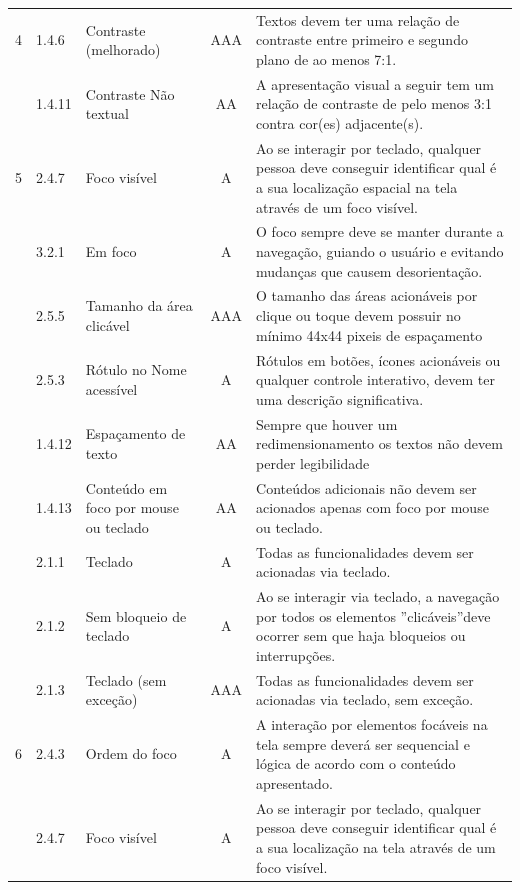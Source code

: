 {{\begin{minipage}{\linewidth}
{\begin{tabular}{|c|l|l|c|p{400px}|}
    \hline
    4 & 1.4.6 & 
        Contraste (melhorado) & AAA & Textos devem ter uma relação de contraste entre primeiro e segundo plano de ao menos 7:1.\\
        \cline{2-5} & 1.4.11 & Contraste Não textual & AA & A apresentação visual a seguir tem um relação de contraste de pelo menos 3:1 contra cor(es) adjacente(s).\\
    \hline 
     5 & 2.4.7 & 
        Foco visível  & A & Ao se interagir por teclado, qualquer pessoa deve conseguir identificar qual é a sua localização espacial na tela através de um foco visível.\\
        \cline{2-5} & 3.2.1 & Em foco & A & O foco sempre deve se manter durante a navegação, guiando o usuário e evitando mudanças que causem desorientação.\\
        \cline{2-5} & 2.5.5 & Tamanho da área clicável & AAA & O tamanho das áreas acionáveis por clique ou toque devem possuir no mínimo 44x44 pixeis de espaçamento\\
        \cline{2-5} & 2.5.3 & Rótulo no Nome acessível & A & Rótulos em botões, ícones acionáveis ou qualquer controle interativo, devem ter uma descrição significativa.\\
        \cline{2-5} & 1.4.12 & Espaçamento de texto & AA & Sempre que houver um redimensionamento os textos não devem perder legibilidade\\
        \cline{2-5} & 1.4.13 & Conteúdo em foco por mouse ou teclado & AA & Conteúdos adicionais não devem ser acionados apenas com foco por mouse ou teclado.\\
        \cline{2-5} & 2.1.1 & Teclado & A & Todas as funcionalidades devem ser acionadas via teclado. \\
        \cline{2-5} & 2.1.2 & Sem bloqueio de teclado & A & Ao se interagir via teclado, a navegação por todos os elementos ”clicáveis”deve ocorrer sem que haja bloqueios ou interrupções.\\
        \cline{2-5} & 2.1.3 & Teclado (sem exceção) & AAA & Todas as funcionalidades devem ser acionadas via teclado, sem exceção.\\
    \hline 
    6 & 2.4.3 & 
        Ordem do foco & A & A interação por elementos focáveis na tela sempre deverá ser sequencial e lógica de acordo com o conteúdo apresentado.\\
        \cline{2-5} & 2.4.7 & Foco visível & A & Ao se interagir por teclado, qualquer pessoa deve conseguir identificar qual é a sua localização na tela através de um foco visível. \\

\end{tabular}}
\end{minipage}}}
